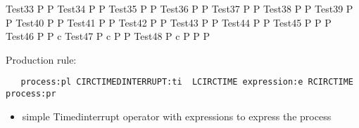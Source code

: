 \documentclass{article}
\begin{document}
\begin{circus}
   \circprocess Test33 \circdef P  \rcirctime P
   \also
   \circprocess Test34 \circdef P  P
   \also
   \circprocess Test35 \circdef P  P
   \also
   \circprocess Test36 \circdef P  P
   \also
   \circprocess Test37 \circdef P  P
   \also
   \circprocess Test38 \circdef P  P
   \also
   \circprocess Test39 \circdef P  P
   \also
   \circprocess Test40 \circdef P  P
   \also
   \circprocess Test41 \circdef P  P
   \also
   \circprocess Test42 \circdef P  P
   \also
   \circprocess Test43 \circdef P  P
   \also
   \circprocess Test44 \circdef P \circtimeout {\lcirctime 1 \upto 20  \rcirctime} P
   \also
   \circprocess Test45 \circdef  P \circseq P  P
   \also
   \circprocess Test46 \circdef P   P \circhide   
   \lchanset c \rchanset
   \also
   \circprocess Test47 \circdef  P  \lpar\lchanset c \rchanset\rpar P  P
   \also
   \circprocess Test48 \circdef  P \lpar \lchanset c \rchanset \rpar P  P  P 
\end{circus}



Production rule:
\begin{verbatim}
   process:pl CIRCTIMEDINTERRUPT:ti  LCIRCTIME expression:e RCIRCTIME  process:pr
\end{verbatim}

\begin{itemize}
   \item simple Timedinterrupt operator with expressions to express the process 
\end{itemize}
\end{document}

